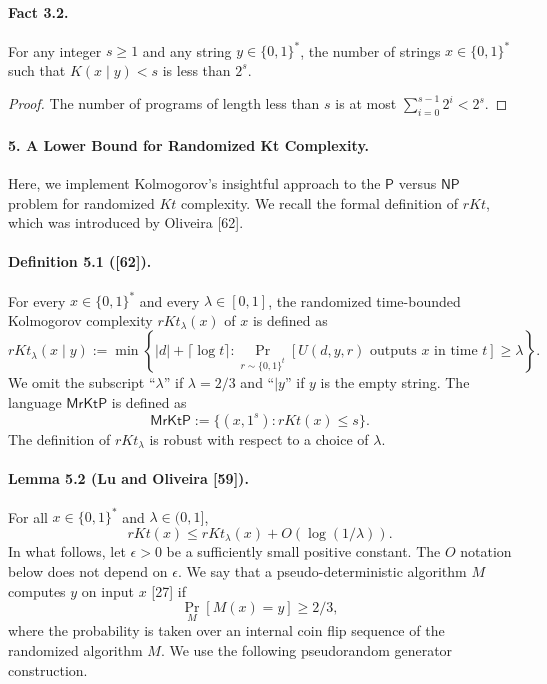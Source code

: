 \documentclass[10pt,a4paper]{article}
\begin{document}
\paragraph{Fact 3.2.}
For any integer $s\geq1$ and any string $y\in\{0,1\}^*$, the number of strings $x\in\{0,1\}^*$ such that $K(x\mid y)<s$ is less than $2^s$.
\begin{proof}
The number of programs of length less than $s$ is at most $\sum_{i=0}^{s-1}2^i<2^s$.
\end{proof}

\paragraph{5. A Lower Bound for Randomized Kt Complexity.}
Here, we implement Kolmogorov's insightful approach to the $\mathsf P$ versus $\mathsf{NP}$ problem for randomized $Kt$ complexity. We recall the formal definition of $rKt$, which was introduced by Oliveira [62].
\paragraph{Definition 5.1 ([62]).}
For every $x\in\{0,1\}^*$ and every $\lambda\in[0,1]$, the randomized time-bounded Kolmogorov complexity $rKt_\lambda(x)$ of $x$ is defined as
\[rKt_\lambda(x\mid y):=\min\left\{|d|+\lceil\log t\rceil:\Pr_{r\sim\{0,1\}^t}[U(d,y,r)\text{ outputs }x\text{ in time }t]\geq\lambda\right\}.\]
We omit the subscript ``$\lambda$'' if $\lambda=2/3$ and ``$\mid y$'' if $y$ is the empty string. The language $\mathsf{MrKtP}$ is defined as
\[\mathsf{MrKtP}:=\{(x,1^s):rKt(x)\leq s\}.\]
The definition of $rKt_\lambda$ is robust with respect to a choice of $\lambda$.
\paragraph{Lemma 5.2 (Lu and Oliveira [59]).}
For all $x\in\{0,1\}^*$ and $\lambda\in(0,1]$,
\[rKt(x)\leq rKt_\lambda(x)+O(\log(1/\lambda)).\]
In what follows, let $\epsilon>0$ be a sufficiently small positive constant. The $O$ notation below does not depend on $\epsilon$. We say that a pseudo-deterministic algorithm $M$ computes $y$ on input $x$ [27] if
\[\Pr_M[M(x)=y]\geq2/3,\]
where the probability is taken over an internal coin flip sequence of the randomized algorithm $M$. We use the following pseudorandom generator construction.
\end{document}
